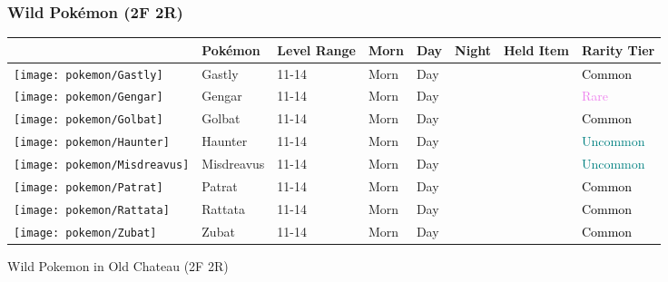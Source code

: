 \subsubsection{Wild Pokémon (2F 2R)}%
\label{ssubsec:WildPokmon(2F2R)}%
\begin{longtable}{||l l l l l l l l||}%
\hline%
&Pokémon&Level Range&Morn&Day&Night&Held Item&Rarity Tier\\%
\hline%
\endhead%
\hline%
\texttt{[image: pokemon/Gastly]}&Gastly&11{-}14&Morn&Day&&&\textcolor{black}{%
Common%
}\\%
\hline%
\texttt{[image: pokemon/Gengar]}&Gengar&11{-}14&Morn&Day&&&\textcolor{violet}{%
Rare%
}\\%
\hline%
\texttt{[image: pokemon/Golbat]}&Golbat&11{-}14&Morn&Day&&&\textcolor{black}{%
Common%
}\\%
\hline%
\texttt{[image: pokemon/Haunter]}&Haunter&11{-}14&Morn&Day&&&\textcolor{teal}{%
Uncommon%
}\\%
\hline%
\texttt{[image: pokemon/Misdreavus]}&Misdreavus&11{-}14&Morn&Day&&&\textcolor{teal}{%
Uncommon%
}\\%
\hline%
\texttt{[image: pokemon/Patrat]}&Patrat&11{-}14&Morn&Day&&&\textcolor{black}{%
Common%
}\\%
\hline%
\texttt{[image: pokemon/Rattata]}&Rattata&11{-}14&Morn&Day&&&\textcolor{black}{%
Common%
}\\%
\hline%
\texttt{[image: pokemon/Zubat]}&Zubat&11{-}14&Morn&Day&&&\textcolor{black}{%
Common%
}\\%
\hline%
\end{longtable}%
\caption{Wild Pokemon in Old Chateau (2F 2R)}